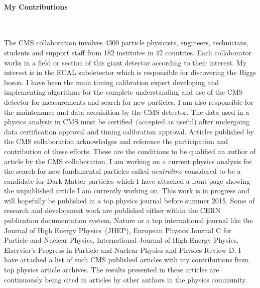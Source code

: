 \documentclass[12pt]{article}
\begin{document}
\paragraph{My Contributions}\mbox{}\\
\par
The CMS collaboration involves 4300 particle physicists, engineers, technicians, students and support staff from 182 institutes in 42 countries.
Each collaborator works in a field or section of this giant detector according to their interest. My interest is in the ECAL subdetector which is responsible for discovering the Higgs boson.
I have been the main timing calibration expert developing and implementing algorithms for the complete understanding and use of the CMS detector for measurements and search for new particles. I am also responsible for the maintenance and data acquisition by the CMS detector. The data used in a physics analysis in CMS must be certified~(accepted as useful) after undergoing  data certification approval and timing calibration approval. Articles  published by the CMS collaboration acknowledges and reference the participation and contribution of these efforts. These are the conditions to be qualified an author of article by the CMS collaboration. 
I am working on a current physics analysis for the search for new fundamental particles called \textit{neutralino} considered to be a candidate for Dark Matter particles which I have attached a front page showing the unpublished article I am currently working on. This work is in progress and will hopefully be published in a top physics journal before summer 2015. Some of research and development work are published either within the CERN publication documentation system, Nature or a top international journal like the Journal of High Energy Physics~(JHEP), European Physics Journal C for Particle and Nuclear Physics, International Journal of High Energy Physics, Elservier's Progress in Particle and Nuclear Physics and Physics Review D.  I have attached a list of such CMS published articles with my contributions from top physics article archives. The results presented in these articles are continuously being cited in articles by other authors in the physics community.
\end{document}
